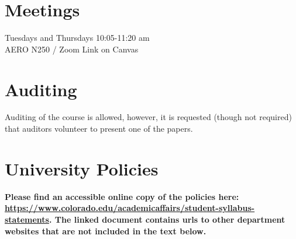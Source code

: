 \documentclass[9pt]{article}
\begin{document}
\section*{Meetings}

Tuesdays and Thursdays 10:05-11:20 am\\
AERO N250 / Zoom Link on Canvas

\section*{Auditing}

Auditing of the course is allowed, however, it is requested (though not required) that auditors volunteer to present one of the papers.

\section*{University Policies}

\textbf{Please find an accessible online copy of the policies here: \url{https://www.colorado.edu/academicaffairs/student-syllabus-statements}. The linked document contains urls to other department websites that are not included in the text below.}
\end{document}
